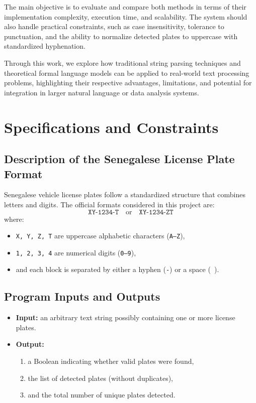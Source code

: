 \documentclass[12pt,a4paper]{article}
\begin{document}
The main objective is to evaluate and compare both methods in terms of their implementation 
complexity, execution time, and scalability. The system should also handle practical constraints, 
such as case insensitivity, tolerance to punctuation, and the ability to normalize detected plates 
to uppercase with standardized hyphenation.

Through this work, we explore how traditional string parsing techniques and theoretical formal 
language models can be applied to real-world text processing problems, highlighting their respective 
advantages, limitations, and potential for integration in larger natural language or data analysis systems.

\newpage

\section{Specifications and Constraints}

\subsection{Description of the Senegalese License Plate Format}
Senegalese vehicle license plates follow a standardized structure that combines letters and digits.
The official formats considered in this project are:
\[
\texttt{XY-1234-T} \quad \text{or} \quad \texttt{XY-1234-ZT}
\]
where:
\begin{itemize}
    \item \texttt{X, Y, Z, T} are uppercase alphabetic characters (\texttt{A--Z}),
    \item \texttt{1, 2, 3, 4} are numerical digits (\texttt{0--9}),
    \item and each block is separated by either a hyphen (\texttt{-}) or a space (\texttt{ }).
\end{itemize}

\subsection{Program Inputs and Outputs}
\begin{itemize}
    \item \textbf{Input:} an arbitrary text string possibly containing one or more license plates.
    \item \textbf{Output:}
    \begin{enumerate}
        \item a Boolean indicating whether valid plates were found,
        \item the list of detected plates (without duplicates),
        \item and the total number of unique plates detected.
    \end{enumerate}
\end{itemize}
\end{document}
